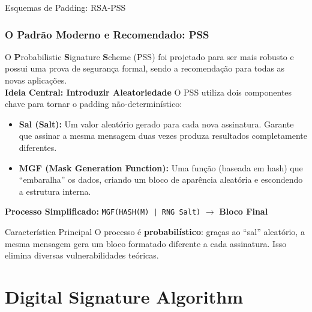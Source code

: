\documentclass{beamer}
\begin{document}
\begin{frame}{Esquemas de Padding: RSA-PSS}
    \frametitle{O Padrão Moderno e Recomendado: PSS}
    \small
    O \textbf{P}robabilistic \textbf{S}ignature \textbf{S}cheme (PSS) foi projetado para ser mais robusto e possui uma prova de segurança formal, sendo a recomendação para todas as novas aplicações.\\
    \textbf{Ideia Central: Introduzir Aleatoriedade}
    O PSS utiliza dois componentes chave para tornar o padding não-determinístico:
    \begin{itemize}
        \small
        \item \textbf{Sal (Salt):} Um valor aleatório gerado para cada nova assinatura. Garante que assinar a mesma mensagem duas vezes produza resultados completamente diferentes.
        \item \textbf{MGF (Mask Generation Function):} Uma função (baseada em hash) que ``embaralha'' os dados, criando um bloco de aparência aleatória e escondendo a estrutura interna.
    \end{itemize}
    \textbf{Processo Simplificado:}
    \texttt{MGF(HASH(M) | RNG Salt)} $\rightarrow$ \textbf{Bloco Final}
    
    \begin{alertblock}{Característica Principal}
        O processo é \textbf{probabilístico}: graças ao ``sal'' aleatório, a mesma mensagem gera um bloco formatado diferente a cada assinatura. Isso elimina diversas vulnerabilidades teóricas.
    \end{alertblock}
\end{frame}


\section{Digital Signature Algorithm}
\end{document}
